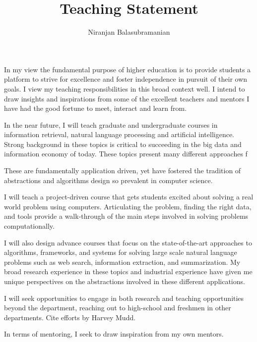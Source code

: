 \documentclass[a4paper,11pt,onecolumn]{article}
\begin{document}

\title{Teaching Statement}
\author{Niranjan Balasubramanian}
\maketitle

In my view the fundamental purpose of higher education is to provide students a platform to strive for excellence and foster independence in pursuit of their own goals. I view my teaching responsibilities in this broad context well. I intend to draw insights and inspirations from some of the excellent teachers and mentors I have had the good fortune to meet, interact and learn from.

In the near future, I will teach graduate and undergraduate courses in information retrieval, natural language processing and artificial intelligence. Strong background in these topics is critical to succeeding in the big data and information economy of today. These topics present many different approaches f

These are fundamentally application driven, yet have fostered the tradition of abstractions and algorithms design so prevalent in computer science. 

I will teach a project-driven course that gets students excited about solving a real world problem using computers. Articulating the problem, finding the right data, and tools provide a walk-through of the main steps involved in solving problems computationally.

I will also design advance courses that focus on the state-of-the-art approaches to algorithms, frameworks, and systems for solving large scale natural language problems such as web search, information extraction, and summarization. My broad research experience in these topics and industrial experience have given me unique perspectives on the abstractions involved in these different applications. 

I will seek opportunities to engage in both research and teaching opportunities beyond the department, reaching out to high-school and freshmen in other departments. Cite efforts by Harvey Mudd.

In terms of mentoring, I seek to draw inspiration from my own mentors. 







\end{document}
